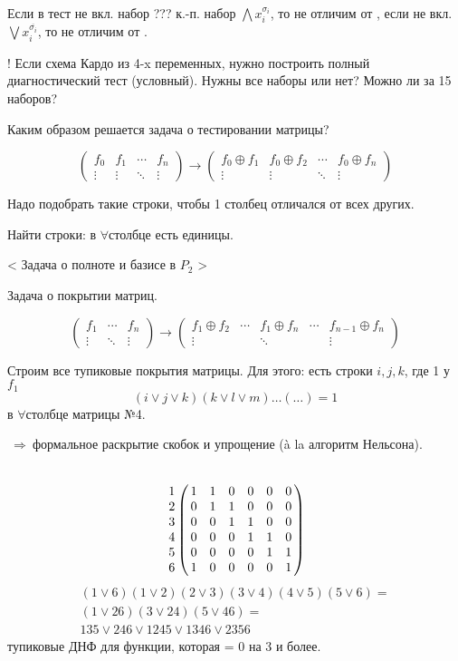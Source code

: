 \documentclass[draft]{report}
\newcommand{\then}{\ensuremath{\ \Rightarrow\ }}
\newcommand{\F}{\ensuremath{\forall}}
\theoremstyle {remark}
\theoremstyle {remark}
\begin{document}
Если в тест не вкл. набор ??? к.-п. набор \( \bigwedge x_i^{\sigma_i} \),
то не отличим от , если не вкл. \( \bigvee x_i^{\overline{\sigma_i}} \), то
не отличим от .

! Если схема Кардо из 4-x переменных, нужно построить полный диагностический
тест (условный). Нужны все наборы или нет? Можно ли за 15 наборов?

Каким образом решается задача о тестировании матрицы?

\[
\begin{pmatrix}
	f_0    & f_1    & \cdots & f_n \\
	\vdots & \vdots & \ddots & \vdots
\end{pmatrix}
\rightarrow
\begin{pmatrix}
	f_0 \oplus f_1 & f_0 \oplus f_2 & \cdots & f_0 \oplus f_n \\
	\vdots         & \vdots         & \ddots & \vdots
\end{pmatrix}
\]

Надо подобрать такие строки, чтобы 1 столбец отличался от всех других.

Найти строки: в \F столбце есть единицы.

< Задача о полноте и базисе в \( P_2 \) >

Задача о покрытии матриц.

\[
\begin{pmatrix}
	f_1    & \cdots & f_n \\
	\vdots & \ddots & \vdots
\end{pmatrix}
\rightarrow
\begin{pmatrix}
	f_1 \oplus f_2 & \cdots & f_1 \oplus f_n & \cdots & f_{n-1} \oplus f_n \\
	\vdots         &        & \ddots         &        & \vdots
\end{pmatrix}
\]

Строим все тупиковые покрытия матрицы. Для этого: есть строки \( i, j, k \),
где 1 у \( f_1 \)
\[
	( i \lor j \lor k ) ( k \lor l \lor m ) \ldots ( \ldots ) = 1
\]
в \F столбце матрицы №4.

\then формальное раскрытие скобок и упрощение (à la алгоритм Нельсона).

\[
\bordermatrix{
	  &   &   &   &   &   &   \cr
	1 & 1 & 1 & 0 & 0 & 0 & 0 \cr
	2 & 0 & 1 & 1 & 0 & 0 & 0 \cr
	3 & 0 & 0 & 1 & 1 & 0 & 0 \cr
	4 & 0 & 0 & 0 & 1 & 1 & 0 \cr
	5 & 0 & 0 & 0 & 0 & 1 & 1 \cr
	6 & 1 & 0 & 0 & 0 & 0 & 1 \cr
}
\]
\begin{multline*}
	(1 \lor 6)(1 \lor 2)(2 \lor 3)(3 \lor 4)(4 \lor 5)(5 \lor 6) = \\
	(1 \lor 26)(3 \lor 24)(5 \lor 46) = \\
	135 \lor 246 \lor 1245 \lor 1346 \lor 2356
\end{multline*}
тупиковые ДНФ для функции, которая = 0 на 3 и более.
\end{document}
